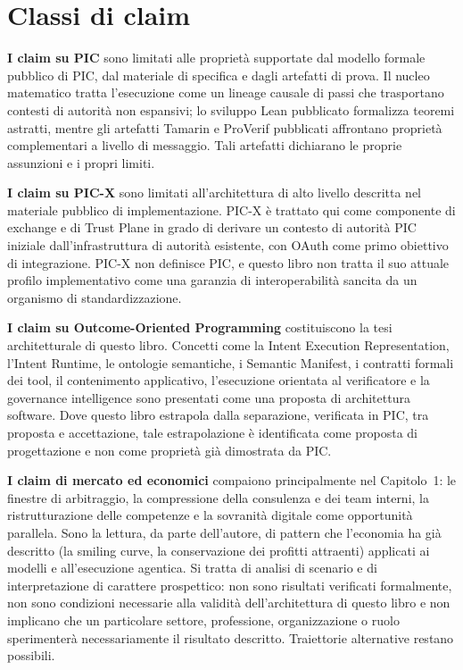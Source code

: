 \documentclass[10pt,oneside,openany]{book}
\begin{document}
\section{Classi di claim}
\textbf{I claim su PIC} sono limitati alle proprietà supportate dal modello formale pubblico di PIC, dal materiale di specifica e dagli artefatti di prova. Il nucleo matematico tratta l'esecuzione come un lineage causale di passi che trasportano contesti di autorità non espansivi; lo sviluppo Lean pubblicato formalizza teoremi astratti, mentre gli artefatti Tamarin e ProVerif pubblicati affrontano proprietà complementari a livello di messaggio. Tali artefatti dichiarano le proprie assunzioni e i propri limiti.

\textbf{I claim su PIC-X} sono limitati all'architettura di alto livello descritta nel materiale pubblico di implementazione. PIC-X è trattato qui come componente di exchange e di Trust Plane in grado di derivare un contesto di autorità PIC iniziale dall'infrastruttura di autorità esistente, con OAuth come primo obiettivo di integrazione. PIC-X non definisce PIC, e questo libro non tratta il suo attuale profilo implementativo come una garanzia di interoperabilità sancita da un organismo di standardizzazione.

\textbf{I claim su Outcome-Oriented Programming} costituiscono la tesi architetturale di questo libro. Concetti come la Intent Execution Representation, l'Intent Runtime, le ontologie semantiche, i Semantic Manifest, i contratti formali dei tool, il contenimento applicativo, l'esecuzione orientata al verificatore e la governance intelligence sono presentati come una proposta di architettura software. Dove questo libro estrapola dalla separazione, verificata in PIC, tra proposta e accettazione, tale estrapolazione è identificata come proposta di progettazione e non come proprietà già dimostrata da PIC.

\textbf{I claim di mercato ed economici} compaiono principalmente nel Capitolo~1: le finestre di arbitraggio, la compressione della consulenza e dei team interni, la ristrutturazione delle competenze e la sovranità digitale come opportunità parallela. Sono la lettura, da parte dell'autore, di pattern che l'economia ha già descritto (la smiling curve, la conservazione dei profitti attraenti) applicati ai modelli e all'esecuzione agentica. Si tratta di analisi di scenario e di interpretazione di carattere prospettico: non sono risultati verificati formalmente, non sono condizioni necessarie alla validità dell'architettura di questo libro e non implicano che un particolare settore, professione, organizzazione o ruolo sperimenterà necessariamente il risultato descritto. Traiettorie alternative restano possibili.
\end{document}
